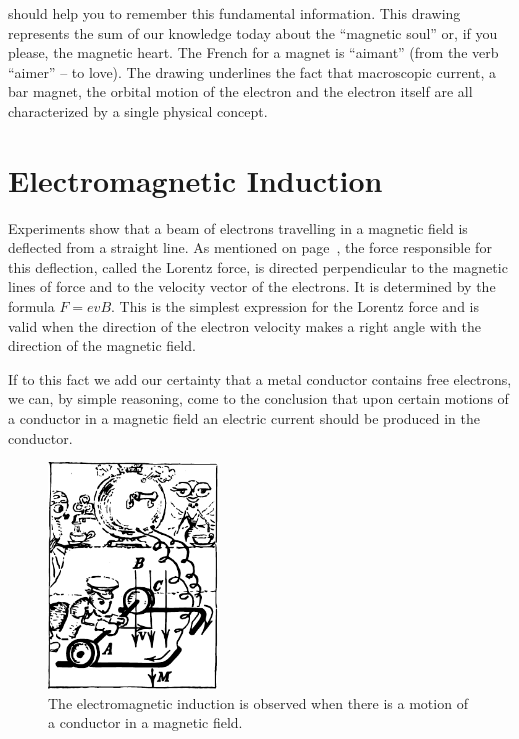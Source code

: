  should help you to remember this fundamental information. This drawing represents the sum of our knowledge today about the ``magnetic soul'' or, if you please, the magnetic heart. The French for a magnet is ``aimant'' (from the verb ``aimer'' -- to love). The drawing underlines the fact that macroscopic current, a bar magnet, the orbital motion of the electron and the electron itself are all characterized by a single physical concept.


\section{Electromagnetic Induction}
Experiments show that a beam of electrons travelling in a magnetic field is deflected from a straight line. As mentioned on page~\pageref{lorentz-force}, the force responsible for this deflection, called the Lorentz force, is directed perpendicular to the magnetic lines of force and to the velocity vector of the electrons. It is determined by the formula $F = evB$. This is the simplest expression for the Lorentz force and is valid when the direction of the electron velocity makes a right angle with the direction of the magnetic field.

If to this fact we add our certainty that a metal conductor contains free electrons, we can, by simple reasoning, come to the conclusion that upon certain motions of a conductor in a magnetic field an electric current should be produced in the conductor.

\begin{figure}[!ht]
\centering
\includegraphics[width=0.4\textwidth]{figures/fig-03-07.pdf}
\caption{The electromagnetic induction is observed when there is a motion of a conductor in a magnetic field.}
\label{fig-3.7}
\end{figure}


